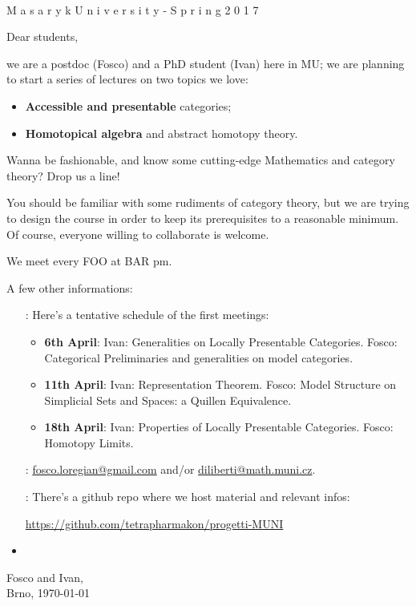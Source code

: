 \documentclass{article}
\begin{document}
\begin{center}
\underline{\huge{}}\\[3em]
\Large \titlefotn M a s a r y k \hspace{5pt} U n i v e r s i t y \hspace{5pt} - \hspace{5pt} S p r i n g \hspace{5pt} 2 0 1 7
\end{center}
Dear students,

we are a postdoc (Fosco) and a PhD student (Ivan) here in MU; we are planning to start a series of lectures on two topics we love:
\begin{itemize}
	\item \textbf{Accessible and presentable} categories; 
	\item \textbf{Homotopical algebra} and abstract homotopy theory.
\end{itemize}

Wanna be fashionable, and know some cutting-edge Mathematics and category theory? Drop us a line!

You should be familiar with some rudiments of category theory, but we are trying to design the course in order to keep its prerequisites to a reasonable minimum. Of course, everyone willing to collaborate is welcome.

We meet every FOO at BAR pm.

A few other informations:
\begin{itemize}
\item[\faCalendarCheckO \; :] Here's a tentative schedule of the first meetings:
\begin{itemize}
\item \textbf{6th April}: Ivan: Generalities on Locally Presentable Categories. Fosco: Categorical Preliminaries and generalities on model categories.
\item \textbf{11th April}: Ivan: Representation Theorem. Fosco: Model Structure on Simplicial Sets and Spaces: a Quillen Equivalence.
\item \textbf{18th April}: Ivan: Properties of Locally Presentable Categories. Fosco: Homotopy Limits.
\end{itemize}
\item[\faEnvelopeO \; :] \href{mailto:fosco.loregian@gmail.com}{fosco.loregian@gmail.com} and/or \href{mailto:diliberti@math.muni.cz}{diliberti@math.muni.cz}.
\item[\faGithub \; :] There's a github repo where we host material and relevant infos: 
\begin{center}\href{https://github.com/tetrapharmakon/progetti-MUNI}{https://github.com/tetrapharmakon/progetti-MUNI}
\end{center}
\item
\end{itemize}
\begin{flushright}
Fosco and Ivan,\\ 
Brno, \today
\end{flushright}
\end{document}
